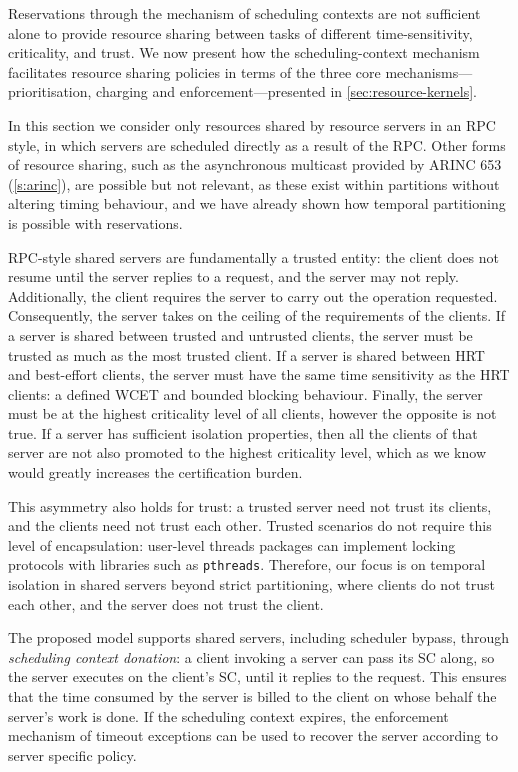 Reservations through the mechanism of scheduling contexts are not sufficient alone to provide
resource sharing between tasks of different time-sensitivity, criticality, and trust. We now
present how the scheduling-context mechanism facilitates resource sharing policies 
in terms of the three core mechanisms---prioritisation, charging and enforcement---presented 
in \cref{sec:resource-kernels}.

In this section we consider only resources shared by resource servers in an \gls{RPC} style, in
which servers are scheduled directly as a result of the \gls{RPC}. Other forms of resource sharing, such
as the asynchronous multicast provided by ARINC 653 (\cref{s:arinc}), are possible but not
relevant, as these exist within partitions without altering timing behaviour, and we have already shown how temporal partitioning is possible with
reservations. 

\gls{RPC}-style shared servers are fundamentally a trusted entity: the client does not resume until the
server replies to a request, and the server may not reply. Additionally, the client requires the
server to carry out the operation requested. Consequently, the server takes on the ceiling of the
requirements of the clients. If a server is shared between trusted and untrusted clients, the
server must be trusted as much as the most trusted client. If a server is shared between \gls{HRT}
and best-effort clients, the server must have the same time sensitivity as the HRT clients: a defined 
\gls{WCET} and bounded blocking behaviour. Finally, the server must be at the highest criticality
level of all clients, however the opposite is not true. If a server has sufficient isolation
properties, then all the clients of that server are not also promoted to the
highest criticality level, which as we know would greatly increases the certification burden. 

This asymmetry also holds for trust: a trusted server need not trust its clients,
and the clients need not trust each other. 
Trusted scenarios do not require this level of encapsulation: user-level threads packages can implement
locking protocols with libraries such as \texttt{pthreads}. Therefore, our focus is on temporal
isolation in shared servers beyond strict partitioning, where clients do not trust each other, and
the server does not trust the client.

The proposed model supports shared servers, including scheduler
bypass, through \emph{scheduling context
donation}: a client invoking a server can pass its SC along, so the
server executes on the client's SC, until it replies to the
request. This ensures that the time consumed by the server is billed
to the client on whose behalf the server's work is done. If the scheduling context 
expires, the enforcement mechanism of timeout exceptions can be used to recover the server according 
to server specific policy.

